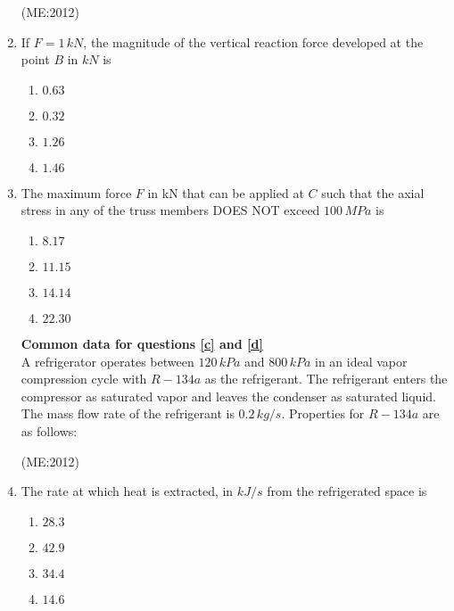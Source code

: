 \documentclass[journal,12pt,onecolumn]{IEEEtran}
\theoremstyle{remark}
\begin{document}
\begin{enumerate}
     \hfill{(ME:2012)}

        \item
		If $F = 1 \, kN$, the magnitude of the vertical reaction force developed at the point $B$ in $kN$ is
		\label{a}
		\begin{multicols}{4}
        \begin{enumerate}
            \item $0.63$
            \item $0.32$
            \item $1.26$
            \item $1.46$
        \end{enumerate}
		\end{multicols}
        \item
		The maximum force $F$ in kN that can be applied at $C$ such that the axial stress in any of the truss members DOES NOT exceed $100 \, MPa$ is
		\label{b}
		\begin{multicols}{4}
        \begin{enumerate}	
            \item $8.17$
            \item $11.15$
            \item $14.14$
            \item $22.30$
        \end{enumerate}
	\end{multicols}
\vspace{0.5cm}
     \textbf{Common data for questions \ref{c} and \ref{d}} \\ 
    A refrigerator operates between $120 \, kPa$ and $800 \, kPa$ in an ideal vapor compression cycle with $R-134a$ as the refrigerant. The refrigerant enters the compressor as saturated vapor and leaves the condenser as saturated liquid. The mass flow rate of the refrigerant is $0.2 \, kg/s$. Properties for $R-134a$ are as follows:
    \vspace{0.01cm}
    
    \vspace{0.1cm}
    

     \hfill{(ME:2012)}

        \item
		The rate at which heat is extracted, in $kJ/s$ from the refrigerated space is
		\label{c}
		\begin{multicols}{4}
        \begin{enumerate}
            \item $28.3$
            \item $42.9$
            \item $34.4$
            \item $14.6$
        \end{enumerate}
		\end{multicols}


\end{enumerate}
\end{document}
